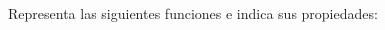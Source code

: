\documentclass[spanish, 11pt]{exam}
\begin{document}
\begin{questions}
\begin{multicols}{2}
\end{multicols}


\question Representa las siguientes funciones e indica sus propiedades:
\begin{multicols}{2}
\begin{parts} 

\end{parts}
\end{multicols}
\end{questions}
\end{document}
